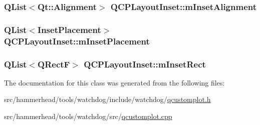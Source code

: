 \subsubsection[{\texorpdfstring{m\+Inset\+Alignment}{mInsetAlignment}}]{\setlength{\rightskip}{0pt plus 5cm}Q\+List$<$Qt\+::\+Alignment$>$ Q\+C\+P\+Layout\+Inset\+::m\+Inset\+Alignment\hspace{0.3cm}{\ttfamily [protected]}}\hypertarget{classQCPLayoutInset_a55e9b84c310136ff985a6544184ab64a}{}\label{classQCPLayoutInset_a55e9b84c310136ff985a6544184ab64a}
\subsubsection[{\texorpdfstring{m\+Inset\+Placement}{mInsetPlacement}}]{\setlength{\rightskip}{0pt plus 5cm}Q\+List$<${\bf Inset\+Placement}$>$ Q\+C\+P\+Layout\+Inset\+::m\+Inset\+Placement\hspace{0.3cm}{\ttfamily [protected]}}\hypertarget{classQCPLayoutInset_a57a0a4e445cc78eada29765ecf092abe}{}\label{classQCPLayoutInset_a57a0a4e445cc78eada29765ecf092abe}
\subsubsection[{\texorpdfstring{m\+Inset\+Rect}{mInsetRect}}]{\setlength{\rightskip}{0pt plus 5cm}Q\+List$<$Q\+RectF$>$ Q\+C\+P\+Layout\+Inset\+::m\+Inset\+Rect\hspace{0.3cm}{\ttfamily [protected]}}\hypertarget{classQCPLayoutInset_aaa8f6b5029458f3d97a65239524a2b33}{}\label{classQCPLayoutInset_aaa8f6b5029458f3d97a65239524a2b33}


The documentation for this class was generated from the following files\+:\begin{DoxyCompactItemize}
\item 
src/hammerhead/tools/watchdog/include/watchdog/\hyperlink{qcustomplot_8h}{qcustomplot.\+h}\item 
src/hammerhead/tools/watchdog/src/\hyperlink{qcustomplot_8cpp}{qcustomplot.\+cpp}\end{DoxyCompactItemize}
